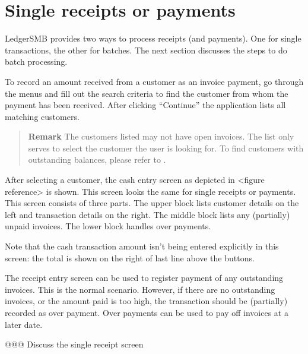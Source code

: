 \section{Single receipts or payments}
\label{sec-business-processes-payment-processing-single-payments}

LedgerSMB provides two ways to process receipts (and payments). One for single transactions,
the other for batches. The next section discusses the steps to do batch processing.

To record an amount received from a \gls{customer} as an invoice payment, go through the menus
 and fill out the search criteria to find the customer from whom
the payment has been received. After clicking ``Continue'' the application lists all matching
customers.

\begin{quote}
\textbf{Remark} The customers listed may not have open invoices. The list only serves to select
the \gls{customer} the user is looking for. To find customers with outstanding balances, please refer to
.
\end{quote}

After selecting a \gls{customer}, the cash entry screen as depicted in <figure reference> is shown. This
screen looks the same for single receipts or payments. This screen consists of three parts. The upper
block lists customer details on the left and transaction details on the right. The middle block lists
any (partially) unpaid invoices. The lower block handles over payments.

Note that the cash transaction amount isn't being entered explicitly in this screen: the total
is shown on the right of last line above the buttons.

The receipt entry screen can be used to register payment of any outstanding invoices. This is the
normal scenario. However, if there are no outstanding invoices, or the amount paid is too high,
the transaction should be (partially) recorded as over payment. Over payments can be used to
pay off invoices at a later date.


@@@ Discuss the single receipt screen



